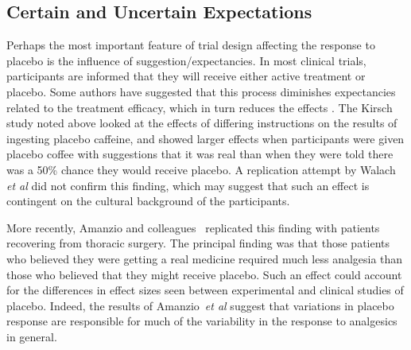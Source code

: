 


\subsection{Certain and Uncertain Expectations}
\label{sec:cert-uncert-expect}
Perhaps the most important feature of trial design affecting the response to placebo  is the influence of suggestion/expectancies. In most clinical trials, participants are informed that they will receive either active treatment or placebo. Some authors have suggested \cite{kirsch1988double}  that this process diminishes expectancies related to the treatment efficacy, which in turn reduces the effects \cite{Kleijnen1994}. The Kirsch study noted above looked at the effects of differing instructions on the results of ingesting placebo caffeine, and showed larger effects when participants were given placebo coffee with suggestions that it was real than when they were told there was a 50\% chance they would receive placebo. A replication attempt by Walach \textit{et al} did not confirm this finding, which may suggest that such an effect is contingent on the cultural background of the participants. 

More recently, Amanzio and colleagues~\cite{Amanzio2001} replicated this finding with patients recovering from thoracic surgery. The principal finding was that those patients who believed they were getting a real medicine required much less analgesia than those who believed that they might receive placebo. Such an effect could account for the differences in effect sizes seen between experimental and clinical studies of placebo. Indeed, the results of  Amanzio~\textit{et al} suggest that variations in placebo response are responsible for much of the variability in the response to analgesics in general.

